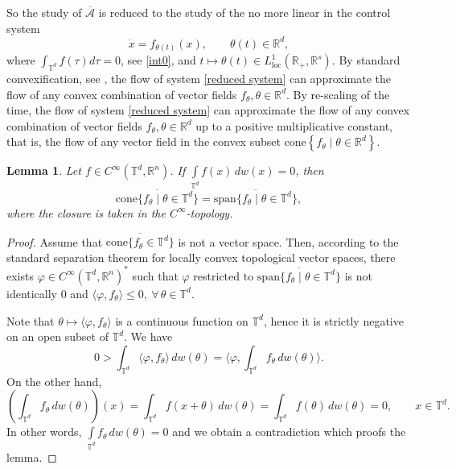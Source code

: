 \documentclass[10pt]{article}
\newcommand{\R}{{\mathbb R}}
\newcommand{\T}{{\mathbb T}}
\newcommand{\ov}{\overline}
\newtheorem{lemma}{Lemma}
\begin{document}
So the study of $ \ov{\mathcal{A}}$ is reduced to the study of the no more linear in the control system 
\begin{equation} \label{reduced system}
    \dot{x}=f_{\theta(t)}(x), \qquad \theta(t) \in \R^d,
\end{equation}
where $\int_{\T^d}f(\tau)d\tau=0$, see \cref{int0}, and $t\mapsto \theta(t)\in L^1_{\mathrm{loc}}(\R_+,\R^s)$. By standard convexification, see \cite[Th. 8.7]{AgSa}, the flow of system \eqref{reduced system} can approximate the flow of any convex combination of vector fields $f_\theta,\theta\in \R^d$. By re-scaling of the time, the flow of system \eqref{reduced system} can approximate the flow of any convex combination of vector fields $f_\theta, \theta \in \R^d$ up to a positive multiplicative constant, that is, the flow of any vector field in the convex subset 
$\mathrm{cone}\left\{f_\theta \mid \theta \in \R^d\right\}$.

\begin{lemma} \label{Lemma cone}
Let $f\in C^\infty(\T^d,\R^n)$. If $\int\limits_{\T^d}f(x)\,dw(x)=0$, then
$$
\overline{\mathrm{cone}\{f_\theta \mid \theta\in\T^d\}}=\overline{\mathrm{span}\{f_\theta \mid \theta\in\T^d\}},
$$
where the closure is taken in the $C^\infty$-topology.
\end{lemma}

\begin{proof}
    Assume that $\overline{\mathrm{cone}\{f_\theta\in\T^d\}}$ is not a vector space. Then, according to the standard separation theorem
for locally convex topological vector spaces, there exists $\varphi\in C^\infty(\T^d,\R^n)^*$ such that 
$\varphi$ restricted to ${\overline{\mathrm{span}\{f_\theta\mid \theta\in\T^d\}}}$ is not identically 0 and 
$\langle\varphi,f_\theta\rangle\le 0,\ \forall\,\theta\in\T^d$.

Note that $\theta\mapsto \langle \varphi,f_\theta\rangle$ is a continuous function on $\T^d$, hence it is strictly negative on an open subset of $\T^d$.
We have
$$
0>\int_{\T^d}\langle\varphi,f_\theta\rangle\,dw (\theta)=\langle\varphi,\int_{\T^d}f_\theta\,dw (\theta)\rangle.
$$
On the other hand, 
$$
\left(\int_{\T^d}f_\theta\,dw(\theta)\right)(x)=\int_{\T^d}f(x+\theta)\,dw(\theta)= \int_{\T^d}f(\theta)\,dw(\theta)=0,\qquad x\in\T^d.
$$
In other words, $\int\limits_{\T^d}f_\theta\,dw(\theta)=0$ and we obtain a contradiction which proofs the lemma.
\end{proof}
\end{document}
